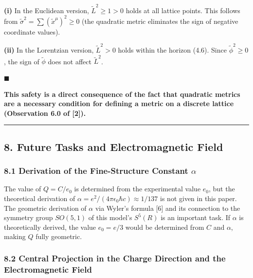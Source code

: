 \documentclass[a4paper,11pt]{article}
\theoremstyle{definition}
\begin{document}
\textbf{(i)} In the Euclidean version, \(\tilde{L}^2 \geq 1 > 0\) holds at all lattice points. This follows from \(\tilde{\sigma}^2 = \sum (\tilde{x}^\mu)^2 \geq 0\) (the quadratic metric eliminates the sign of negative coordinate values).

\textbf{(ii)} In the Lorentzian version, \(\tilde{L}^2 > 0\) holds within the horizon (4.6). Since \(\tilde{\phi}^2 \geq 0\), the sign of \(\tilde{\phi}\) does not affect \(\tilde{L}^2\).

\(\blacksquare\)

\textbf{This safety is a direct consequence of the fact that quadratic metrics are a necessary condition for defining a metric on a discrete lattice (Observation 6.0 of {[}2{]}).}

\begin{center}\rule{0.5\linewidth}{0.5pt}\end{center}

\subsection{8. Future Tasks and Electromagnetic Field}\label{future-tasks-and-electromagnetic-field}

\subsubsection{\texorpdfstring{8.1 Derivation of the Fine-Structure Constant \(\alpha\)}{8.1 Derivation of the Fine-Structure Constant \textbackslash alpha}}\label{derivation-of-the-fine-structure-constant-alpha}

The value of \(Q = C/e_0\) is determined from the experimental value \(e_0\), but the theoretical derivation of \(\alpha = e^2/(4\pi\epsilon_0 \hbar c) \approx 1/137\) is not given in this paper. The geometric derivation of \(\alpha\) via Wyler's formula {[}6{]} and its connection to the symmetry group \(SO(5,1)\) of this model's \(S^5(R)\) is an important task. If \(\alpha\) is theoretically derived, the value \(e_0 = e/3\) would be determined from \(C\) and \(\alpha\), making \(Q\) fully geometric.

\subsubsection{8.2 Central Projection in the Charge Direction and the Electromagnetic Field}\label{central-projection-in-the-charge-direction-and-the-electromagnetic-field}
\end{document}
